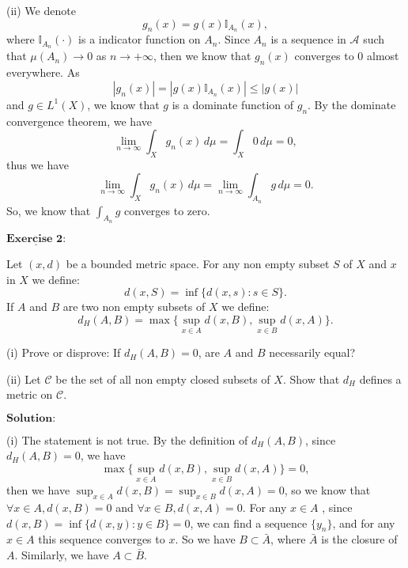 \documentclass[12pt,a4paper]{ctexart}
\begin{document}
(ii) We denote
\begin{equation*}
   g_{n}(x) = g(x) \mathbb{I}_{A_{n}} (x),
\end{equation*}
where $\mathbb{I}_{A_{n}} (\cdot)$ is a indicator function on $A_{n}$. Since $A_{n}$ is a sequence in $\mathcal{A}$ such that $\mu(A_{n}) \to 0$ as $n \to + \infty$, then we know that $g_{n}(x)$ converges to $0$ almost everywhere. As
\begin{equation*}
   |g_{n}(x)| = |g(x) \mathbb{I}_{A_{n}} (x)| \leq |g(x)|
\end{equation*}
and $g \in L^{1}(X)$, we know that $g$ is a dominate function of $g_{n}$. By the dominate convergence theorem, we have
\begin{equation*}
   \lim_{n \to \infty} \int_{X}^{} g_{n}(x) \, d \mu = \int_{X}^{} 0 \, d \mu = 0,
\end{equation*}
thus we have
\begin{equation*}
   \lim_{n \to \infty} \int_{X}^{} g_{n}(x) \, d \mu = \lim_{n \to \infty} \int_{A_{n}}^{} g \, d \mu = 0.
\end{equation*}
So, we know that $\int_{A_{n}}^{} g$ converges to zero.

\newpage

$\underline{\textbf{Exercise 2:}}$

Let $(x, d)$ be a bounded metric space. For any non empty subset $S$ of $X$ and $x$ in $X$ we define:
\begin{equation*}
   d(x, S) = \inf \{d(x, s): s \in S\}.
\end{equation*}
If $A$ and $B$ are two non empty subsets of $X$ we define:
\begin{equation*}
   d_{H}(A, B) = \max \{\sup_{x \in A} d(x, B), \sup_{x \in B} d(x, A) \}.
\end{equation*}

(i) Prove or disprove: If $d_{H}(A, B) = 0$, are $A$ and $B$ necessarily equal?

(ii) Let $\mathcal{C}$ be the set of all non empty closed subsets of $X$. Show that $d_{H}$ defines a metric on $\mathcal{C}$.
  
\vspace{8pt}
$\textbf{Solution:}$

(i) The statement is not true. By the definition of $d_{H}(A, B)$, since $d_{H}(A, B) = 0$, we have
$$\max \{\sup_{x \in A} d(x, B), \sup_{x \in B} d(x, A) \} = 0,$$
then we have $\sup_{x \in A} d(x, B) =  \sup_{x \in B} d(x, A) = 0$, so we know that $\forall x \in A, d(x, B) = 0$ and $\forall x \in B, d(x, A) = 0$. For any $x \in A$
, since $d(x, B) = \inf \{d(x, y): y \in B \} = 0$, we can find a sequence $\{y_{n}\}$, and for any $x \in A$ this sequence converges to $x$. So we have $B \subset \bar{A}$, where $\bar{A}$ is the closure of $A$. Similarly, we have $A \subset \bar{B}$.
\end{document}
